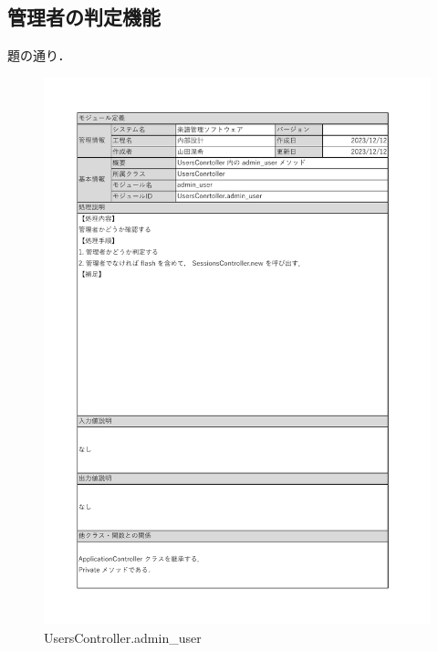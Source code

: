 \subsection*{管理者の判定機能}
題の通り．
\begin{figure}[H]
    \centering
    \includegraphics[scale=0.5]{img/Method/UsersController_admin_user.pdf}
    \caption{UsersController.admin\_user}
\end{figure}
\clearpage

